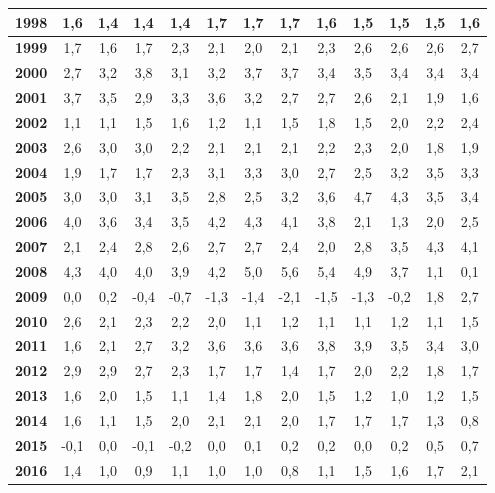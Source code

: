 \begin{center}
\begin{footnotesize}
\begin{longtable}{|c|c|c|c|c|c|c|c|c|c|c|c|c|}
\hline 
\textbf{1998} & 1,6 & 1,4 & 1,4 & 1,4 & 1,7 & 1,7 & 1,7 & 1,6 & 1,5 & 1,5 & 1,5 & 1,6  \\ 
\hline 
\textbf{1999} & 1,7 & 1,6 & 1,7 & 2,3 & 2,1 & 2,0 & 2,1 & 2,3 & 2,6 & 2,6 & 2,6 & 2,7  \\ 
\hline 
\textbf{2000} & 2,7 & 3,2 & 3,8 & 3,1 & 3,2 & 3,7 & 3,7 & 3,4 & 3,5 & 3,4 & 3,4 & 3,4  \\ 
\hline 
\textbf{2001} & 3,7 & 3,5 & 2,9 & 3,3 & 3,6 & 3,2 & 2,7 & 2,7 & 2,6 & 2,1 & 1,9 & 1,6  \\ 
\hline 
\textbf{2002} & 1,1 & 1,1 & 1,5 & 1,6 & 1,2 & 1,1 & 1,5 & 1,8 & 1,5 & 2,0 & 2,2 & 2,4  \\ 
\hline 
\textbf{2003} & 2,6 & 3,0 & 3,0 & 2,2 & 2,1 & 2,1 & 2,1 & 2,2 & 2,3 & 2,0 & 1,8 & 1,9  \\ 
\hline 
\textbf{2004} & 1,9 & 1,7 & 1,7 & 2,3 & 3,1 & 3,3 & 3,0 & 2,7 & 2,5 & 3,2 & 3,5 & 3,3  \\ 
\hline 
\textbf{2005} & 3,0 & 3,0 & 3,1 & 3,5 & 2,8 & 2,5 & 3,2 & 3,6 & 4,7 & 4,3 & 3,5 & 3,4  \\ 
\hline 
\textbf{2006} & 4,0 & 3,6 & 3,4 & 3,5 & 4,2 & 4,3 & 4,1 & 3,8 & 2,1 & 1,3 & 2,0 & 2,5  \\ 
\hline 
\textbf{2007} & 2,1 & 2,4 & 2,8 & 2,6 & 2,7 & 2,7 & 2,4 & 2,0 & 2,8 & 3,5 & 4,3 & 4,1  \\ 
\hline 
\textbf{2008} & 4,3 & 4,0 & 4,0 & 3,9 & 4,2 & 5,0 & 5,6 & 5,4 & 4,9 & 3,7 & 1,1 & 0,1  \\ 
\hline 
\textbf{2009} & 0,0 & 0,2 & -0,4 & -0,7 & -1,3 & -1,4 & -2,1 & -1,5 & -1,3 & -0,2 & 1,8 & 2,7  \\ 
\hline 
\textbf{2010} & 2,6 & 2,1 & 2,3 & 2,2 & 2,0 & 1,1 & 1,2 & 1,1 & 1,1 & 1,2 & 1,1 & 1,5  \\ 
\hline 
\textbf{2011} & 1,6 & 2,1 & 2,7 & 3,2 & 3,6 & 3,6 & 3,6 & 3,8 & 3,9 & 3,5 & 3,4 & 3,0  \\ 
\hline 
\textbf{2012} & 2,9 & 2,9 & 2,7 & 2,3 & 1,7 & 1,7 & 1,4 & 1,7 & 2,0 & 2,2 & 1,8 & 1,7  \\ 
\hline 
\textbf{2013} & 1,6 & 2,0 & 1,5 & 1,1 & 1,4 & 1,8 & 2,0 & 1,5 & 1,2 & 1,0 & 1,2 & 1,5  \\ 
\hline 
\textbf{2014} & 1,6 & 1,1 & 1,5 & 2,0 & 2,1 & 2,1 & 2,0 & 1,7 & 1,7 & 1,7 & 1,3 & 0,8  \\ 
\hline 
\textbf{2015} & -0,1 & 0,0 & -0,1 & -0,2 & 0,0 & 0,1 & 0,2 & 0,2 & 0,0 & 0,2 & 0,5 & 0,7  \\ 
\hline 
\textbf{2016} & 1,4 & 1,0 & 0,9 & 1,1 & 1,0 & 1,0 & 0,8 & 1,1 & 1,5 & 1,6 & 1,7 & 2,1  \\ 

\end{longtable}
\end{footnotesize}
\end{center}
